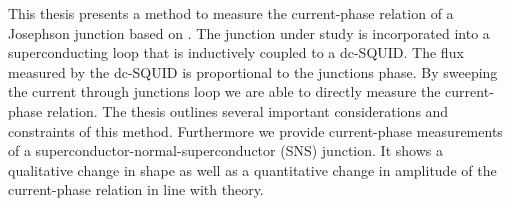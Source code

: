 This thesis presents a method to measure the current-phase relation of a Josephson junction based on \cite{frolovMeasurementCurrentPhaseRelation2004}. The junction under study is incorporated into a superconducting loop that is inductively coupled to a dc-SQUID. The flux measured by the dc-SQUID is proportional to the junctions phase. By sweeping the current through junctions loop we are able to directly measure the current-phase relation. The thesis outlines several important considerations and constraints of this method. Furthermore we provide current-phase measurements of a superconductor-normal-superconductor (SNS) junction. It shows a qualitative change in shape as well as a quantitative change in amplitude of the current-phase relation in line with theory.